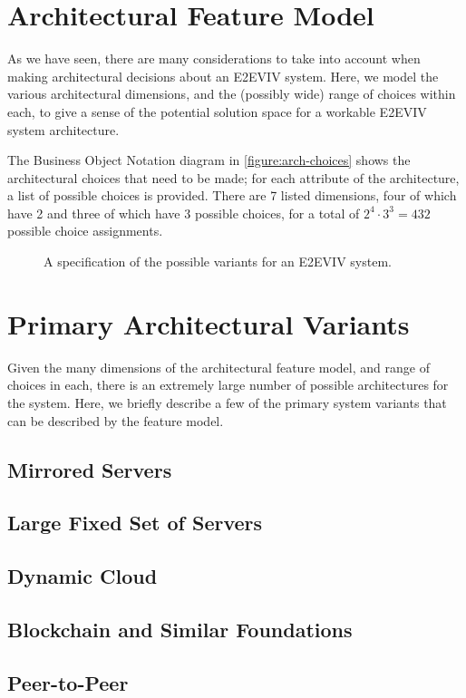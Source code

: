 \section{Architectural Feature Model}

As we have seen, there are many considerations to take into account
when making architectural decisions about an E2EVIV system. Here, we
model the various architectural dimensions, and the (possibly wide)
range of choices within each, to give a sense of the potential
solution space for a workable E2EVIV system architecture.

The Business Object Notation diagram in \autoref{figure:arch-choices}
shows the architectural choices that need to be made; for each
attribute of the architecture, a list of possible choices is
provided. There are 7 listed dimensions, four of which have 2 and
three of which have 3 possible choices, for a total of
$2^4\cdot{}3^3=432$ possible choice assignments.

\begin{figure}[t]
\begin{center}

\end{center}
\caption{A specification of the possible variants for an E2EVIV system.}
\label{figure:arch-choices}
\end{figure}

\section{Primary Architectural Variants}

Given the many dimensions of the architectural feature model, and
range of choices in each, there is an extremely large number of
possible architectures for the system. Here, we briefly describe a few
of the primary system variants that can be described by the feature
model. 

\subsection{Mirrored Servers}
\subsection{Large Fixed Set of Servers}
\subsection{Dynamic Cloud}
\subsection{Blockchain and Similar Foundations}
\subsection{Peer-to-Peer}
